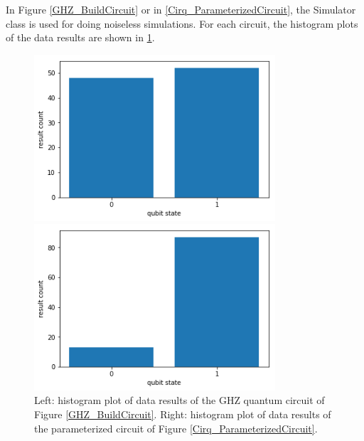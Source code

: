 In Figure \ref{GHZ_BuildCircuit} or in \ref{Cirq_ParameterizedCircuit}, the {\selectfont Simulator} class is used for doing noiseless simulations. For each circuit, the histogram plots of the data results are shown in \ref{DataResults_Cirq}. 
 
 \begin{figure}
 \begin{minipage}[c]{0.5\linewidth}
\hspace{1cm}
\includegraphics[width=0.8\textwidth]{./chapter2/image/Cirq_GHZ_Histogram.png} 
\end{minipage}
\hspace{-1cm}
\begin{minipage}[]{0.5\linewidth}
\centering 
\includegraphics[width=0.8\textwidth]{./chapter2/image/Cirq_ParameterizedCircuit.png} 
\end{minipage}
\caption{\label{DataResults_Cirq} Left: histogram plot of data results of the GHZ quantum circuit of Figure \ref{GHZ_BuildCircuit}. Right: histogram plot of data results of the parameterized circuit of Figure \ref{Cirq_ParameterizedCircuit}.  }
\end{figure}

